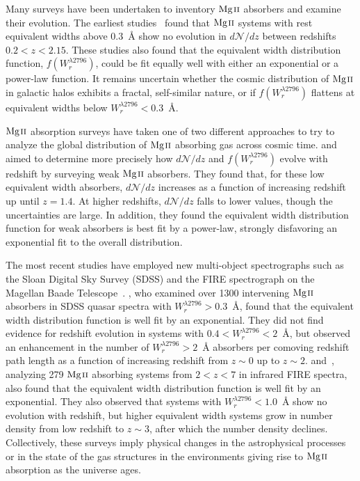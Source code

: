 \documentclass[iop,apj,numberedappendix,appendixfloats,twocolappendix]{emulateapj}
\begin{document}
Many surveys have been undertaken to inventory ${\hbox{{\rm Mg}\kern 0.1em{\sc ii}}}$ absorbers and examine their evolution. The earliest studies~\citep{Lanzetta1987,Tytler1987,Sargent1988,Steidel1992} found that ${\hbox{{\rm Mg}\kern 0.1em{\sc ii}}}$ systems with rest equivalent widths above $0.3$~{\AA} show no evolution in $d\mathcal{N}\!/dz$ between redshifts $0.2 < z < 2.15$. These studies also found that the equivalent width distribution function, $f(W_r^{\lambda2796})$, could be fit equally well with either an exponential or a power-law function. It remains uncertain whether the cosmic distribution of ${\hbox{{\rm Mg}\kern 0.1em{\sc ii}}}$ in galactic halos exhibits a fractal, self-similar nature, or if $f(W_r^{\lambda2796})$ flattens at equivalent widths below $W_r^{\lambda2796} < 0.3$~{\AA}.

${\hbox{{\rm Mg}\kern 0.1em{\sc ii}}}$ absorption surveys have taken one of two different approaches to try to analyze the global distribution of ${\hbox{{\rm Mg}\kern 0.1em{\sc ii}}}$ absorbing gas across cosmic time. \cite{Churchill1999} and \cite{Narayanan2007} aimed to determine more precisely how $d\mathcal{N}\!/dz$ and $f(W_r^{\lambda2796})$ evolve with redshift by surveying weak ${\hbox{{\rm Mg}\kern 0.1em{\sc ii}}}$ absorbers. They found that, for these low equivalent width absorbers, $d\mathcal{N}\!/dz$ increases as a function of increasing redshift up until $z = 1.4$. At higher redshifts, $d\mathcal{N}\!/dz$ falls to lower values, though the uncertainties are large. In addition, they found the equivalent width distribution function for weak absorbers is best fit by a power-law, strongly disfavoring an exponential fit to the overall distribution.

The most recent studies have employed new multi-object spectrographs such as the Sloan Digital Sky Survey (SDSS) and the FIRE spectrograph on the Magellan Baade Telescope~\citep{Nestor2005,Matejek2012,Chen2016}. \cite{Nestor2005}, who examined over 1300 intervening ${\hbox{{\rm Mg}\kern 0.1em{\sc ii}}}$ absorbers in SDSS quasar spectra with $W_r^{\lambda2796} > 0.3$~{\AA}, found that the equivalent width distribution function is well fit by an exponential. They did not find evidence for redshift evolution in systems with $0.4 < W_r^{\lambda2796} < 2$~{\AA}, but observed an enhancement in the number of $W_r^{\lambda2796} > 2$~{\AA} absorbers per comoving redshift path length as a function of increasing redshift from $z \sim 0$ up to $z \sim 2$. \cite{Matejek2012} and~\cite{Chen2016}, analyzing 279 ${\hbox{{\rm Mg}\kern 0.1em{\sc ii}}}$ absorbing systems from $2 < z < 7$ in infrared FIRE spectra, also found that the equivalent width distribution function is well fit by an exponential. They also observed that systems with $W_r^{\lambda2796} < 1.0$~{\AA} show no evolution with redshift, but higher equivalent width systems grow in number density from low redshift to $z \sim 3$, after which the number density declines. Collectively, these surveys imply physical changes in the astrophysical processes or in the state of the gas structures in the environments giving rise to ${\hbox{{\rm Mg}\kern 0.1em{\sc ii}}}$ absorption as the universe ages.
\end{document}
